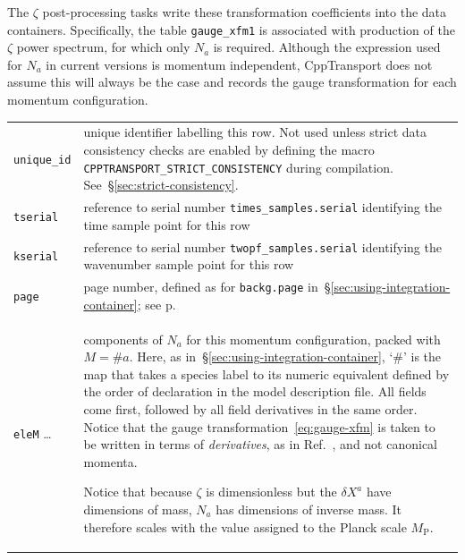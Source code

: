 \documentclass[11pt,a4paper]{article}
\newcommand{\Mp}{M_{\mathrm{P}}}
\newcommand{\packagefont}{\sffamily}
\newcommand{\CppTransport}{{\packagefont CppTransport}}
\newenvironment{sqltablelist}{\renewcommand{\arraystretch}{1.3}\small}{}
\begin{document}
\begin{sqltablelist}
\begin{enumerate}
	The $\zeta$ post-processing tasks write these transformation coefficients into the
	data containers.
	Specifically, the table
	\texttt{gauge_xfm1} is associated with production of the
	$\zeta$ power spectrum,
	for which only $N_a$ is required.
    Although the expression used for $N_a$ in current versions is
    momentum independent, {\CppTransport} does not assume this will always be the
    case and records the gauge transformation for each momentum configuration. \\
    \begin{tabular}{p{2.5cm}p{11.5cm}}
        \texttt{unique_id} & unique identifier labelling this row. Not used
        unless strict data consistency checks are enabled
        by defining the macro
        \texttt{CPPTRANSPORT_STRICT_CONSISTENCY} during
        compilation. See~\S\ref{sec:strict-consistency}. \\
    	\texttt{tserial} & 	reference to serial number \texttt{times_samples.serial}
        identifying the time sample point for this row \\
        \texttt{kserial} & reference to serial number \texttt{twopf_samples.serial}
        identifying the wavenumber sample point for this row \\
        \texttt{page} & page number, defined as for \texttt{backg.page}
        in~\S\ref{sec:using-integration-container}; see p.\pageref{sqltable:backg} \\
        \texttt{eleM} \ldots & components of $N_a$ for this
        momentum configuration, packed with $M= \#a$.
        Here, as in~\S\ref{sec:using-integration-container}, `$\#$'
        is the map that takes a species label to its numeric equivalent
        defined by the order of declaration in the model description file.
        All fields come first, followed by all field derivatives in the same order.
        Notice that
		the gauge transformation~\eqref{eq:gauge-xfm} is taken to be written in
		terms of \emph{derivatives}, as in Ref.~\cite{Dias:2014msa}, and not canonical momenta.
		
		Notice that because $\zeta$ is dimensionless but the $\delta X^a$ have dimensions of
		mass, $N_a$ has dimensions of inverse mass. It therefore scales with the
		value assigned to the Planck scale $\Mp$.
    \end{tabular}
\end{enumerate}
\end{sqltablelist}
\end{document}
